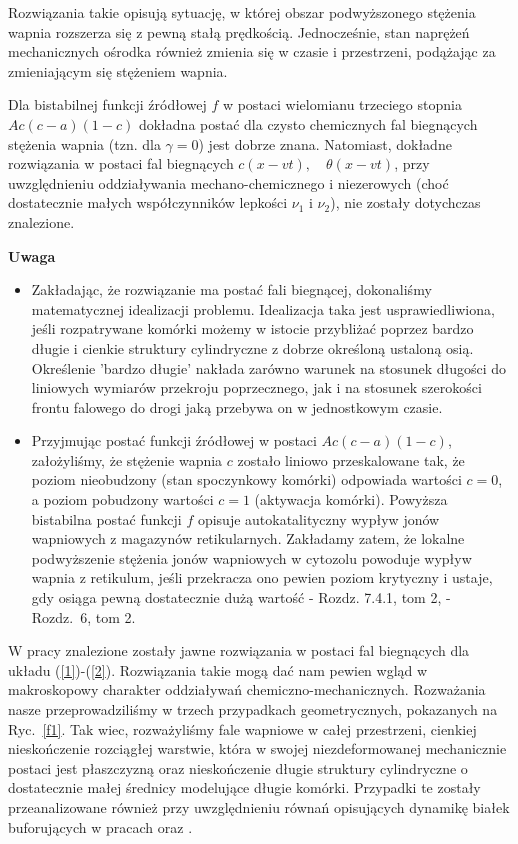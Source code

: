\medskip 

Rozwiązania takie opisują sytuację, w której obszar podwyższonego stężenia wapnia rozszerza się z pewną stałą prędkością. Jednocześnie, stan naprężeń mechanicznych ośrodka również zmienia się w czasie i przestrzeni, podążając za zmieniającym się stężeniem wapnia. 

\medskip 

Dla bistabilnej funkcji źródłowej $f$ w postaci wielomianu trzeciego stopnia $A c(c-a)(1-c)$ dokładna postać dla czysto chemicznych fal biegnących stężenia wapnia (tzn. dla $\gamma=0$) jest dobrze znana. Natomiast, dokładne rozwiązania w postaci fal biegnących $c(x-vt), \quad \theta(x-vt)$, przy uwzględnieniu oddziaływania mechano-chemicznego i niezerowych (choć dostatecznie małych współczynników lepkości $\nu_1$ i $\nu_2$), nie zostały dotychczas znalezione.

\medskip 

\noindent\textbf{ Uwaga}
\begin{itemize}
\item Zakładając, że rozwiązanie ma postać fali biegnącej, dokonaliśmy matematycznej idealizacji problemu. Idealizacja taka jest usprawiedliwiona, jeśli rozpatrywane komórki możemy w istocie przybliżać poprzez bardzo długie i cienkie struktury cylindryczne z dobrze określoną ustaloną osią. 
Określenie 'bardzo długie' nakłada zarówno warunek na stosunek długości do liniowych wymiarów przekroju poprzecznego, jak i na stosunek szerokości frontu falowego do drogi jaką przebywa on w jednostkowym czasie. 
\item Przyjmując postać funkcji źródłowej w postaci $A c(c-a)(1-c)$, założyliśmy, że stężenie wapnia $c$ zostało liniowo przeskalowane tak, że poziom nieobudzony (stan spoczynkowy komórki) odpowiada wartości $c=0$, a poziom pobudzony wartości $c=1$ (aktywacja komórki). Powyższa bistabilna postać funkcji $f$ opisuje autokatalityczny wypływ jonów wapniowych z magazynów retikularnych. Zakładamy zatem, że lokalne podwyższenie stężenia jonów wapniowych w cytozolu powoduje wypływ wapnia z retikulum, jeśli przekracza ono pewien poziom krytyczny i ustaje, gdy osiąga pewną dostatecznie dużą wartość \cite{Keener2009} - Rozdz. 7.4.1, tom 2,\cite{Murray2007} - Rozdz.~6, tom 2. \B
\end{itemize}

\medskip 

W pracy \cite{Kazmierczak2010} znalezione zostały jawne rozwiązania w postaci fal biegnących dla układu (\ref{1})-(\ref{2}). Rozwiązania takie mogą dać nam pewien wgląd w makroskopowy charakter oddziaływań chemiczno-mechanicznych. Rozważania nasze przeprowadziliśmy w trzech przypadkach geometrycznych, pokazanych na Ryc.~\ref{f1}. Tak wiec, rozważyliśmy fale wapniowe w całej przestrzeni, cienkiej nieskończenie rozciągłej warstwie, która w swojej niezdeformowanej mechanicznie postaci jest płaszczyzną oraz nieskończenie długie struktury cylindryczne o dostatecznie małej średnicy modelujące długie komórki. Przypadki te zostały przeanalizowane również przy uwzględnieniu równań opisujących dynamikę białek buforujących w pracach \cite{Kazmierczak2013} oraz \cite{Kazmierczak2011}.

